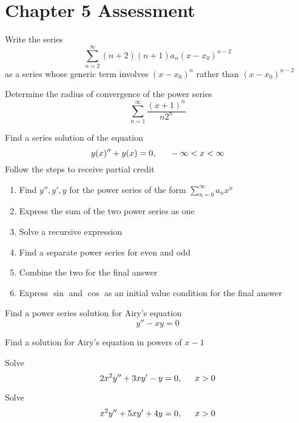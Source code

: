 \section{Chapter 5 Assessment}
	\begin{multicols*}{2}
	
	\begin{q}
		
		Write the series \[ \sum \limits_{n=2}^{\infty} (n+2)(n+1)a_n(x-x_0)^{n-2}  \] as a series whose generic term involves $ (x-x_0)^n $ rather than $ (x-x_0)^{n-2} $
		
	\end{q}
	\begin{q}
		Determine the radius of convergence of the power series \[ \sum \limits_{n=1}^\infty \dfrac{(x+1)^n}{n2^n} \]
	\end{q}
	\begin{q}
		Find a series solution of the equation \[ y(x)'' + y(x) = 0, \indent -\infty < x < \infty \] Follow the steps to receive partial credit
		\begin{enumerate}
			\item Find $ y'', y', y $ for the power series of the form $ \sum \limits_{n=0}^\infty a_nx^n$
			\item Express the sum of the two power series as one 
			\item Solve a recursive expression
			\item Find a separate power series for even and odd
			\item Combine the two for the final answer
			\item Express $ \sin $ and $ \cos $ as an initial value condition for the final answer
		\end{enumerate}
	\end{q}
	\begin{q}
		Find a power series solution for Airy's equation 
		\[ y'' - xy = 0 \]
	\end{q}
	\begin{q}
		Find a solution for Airy's equation in powers of $ x-1 $
	\end{q}
	\begin{q}
		Solve \[ 2x^2 y'' + 3xy' - y = 0, \indent x> 0 \]
	\end{q}
	\begin{q}
		Solve \[ x^2 y'' + 5xy' + 4y = 0, \indent x>0 \]
	\end{q}
\end{multicols*}